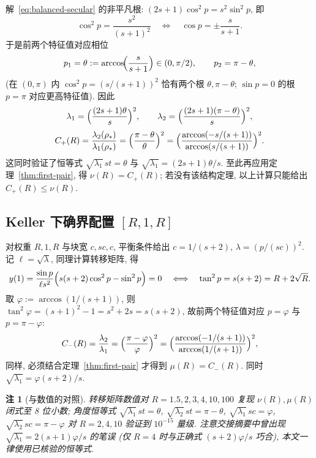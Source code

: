 \documentclass[UTF8]{ctexart}
\newtheorem{remark}[theorem]{注}
\begin{document}
解~\eqref{eq:balanced-secular} 的非平凡根: $(2s+1)\cos^2 p = s^2 \sin^2 p$, 即
\begin{equation}
	\cos^2 p = \frac{s^2}{(s+1)^2}
	\quad\Longleftrightarrow\quad
	\cos p = \pm \frac{s}{s+1} .
\end{equation}
于是前两个特征值对应相位
\begin{equation}
	p_1 = \theta := \arccos\!\Bigl( \frac{s}{s+1} \Bigr) \in (0, \pi/2),
	\qquad
	p_2 = \pi - \theta ,
\end{equation}
(在 $(0, \pi)$ 内 $\cos^2 p = (s/(s+1))^2$ 恰有两个根 $\theta, \pi-\theta$;
$\sin p = 0$ 的根 $p = \pi$ 对应更高特征值). 因此
\begin{equation}
	\lambda_1 = \Bigl( \frac{(2s+1)\theta}{s} \Bigr)^2,
	\qquad
	\lambda_2 = \Bigl( \frac{(2s+1)(\pi-\theta)}{s} \Bigr)^2,
\end{equation}
\begin{equation}
 C_+(R)=\frac{\lambda_2(\rho_*)}{\lambda_1(\rho_*)}
 =\Bigl(\frac{\pi-\theta}{\theta}\Bigr)^2
 =\Bigl(\frac{\arccos(-s/(s+1))}{\arccos(s/(s+1))}\Bigr)^2.
\end{equation}
这同时验证了恒等式 $\sqrt{\lambda_1}\,st = \theta$ 与 $\sqrt{\lambda_1} = (2s+1)\theta/s$.
至此再应用定理~\ref{thm:first-pair}, 得 $\nu(R)=C_+(R)$;
若没有该结构定理, 以上计算只能给出 $C_+(R)\leq\nu(R)$.

\subsection{Keller 下确界配置 \texorpdfstring{$[R,1,R]$}{[R,1,R]}}

对权重 $R, 1, R$ 与块宽 $c, sc, c$, 平衡条件给出 $c = 1/(s+2)$,
$\lambda = (p/(sc))^2$. 记 $\ell=\sqrt\lambda$, 同理计算转移矩阵, 得
\begin{equation}
	y(1) = \frac{\sin p}{\ell s^2}\Bigl( s(s+2)\cos^2 p - \sin^2 p \Bigr) = 0
	\quad\Longleftrightarrow\quad
	\tan^2 p = s(s+2) = R + 2\sqrt{R} .
\end{equation}
取 $\varphi := \arccos(1/(s+1))$, 则 $\tan^2\varphi = (s+1)^2 - 1 = s^2 + 2s = s(s+2)$,
故前两个特征值对应 $p = \varphi$ 与 $p = \pi - \varphi$:
\begin{equation}
 C_-(R)=\frac{\lambda_2}{\lambda_1}=\Bigl(\frac{\pi-\varphi}{\varphi}\Bigr)^2
 =\Bigl(\frac{\arccos(-1/(s+1))}{\arccos(1/(s+1))}\Bigr)^2,
\end{equation}
同样, 必须结合定理~\ref{thm:first-pair} 才得到 $\mu(R)=C_-(R)$.
同时 $\sqrt{\lambda_1}=\varphi(s+2)/s$.

\begin{remark}[与数值的对照]
转移矩阵数值对 $R = 1.5, 2, 3, 4, 10, 100$ 复现 $\nu(R), \mu(R)$ 闭式至 8 位小数;
角度恒等式 $\sqrt{\lambda_1}\,st = \theta$, $\sqrt{\lambda_2}\,st = \pi-\theta$,
$\sqrt{\lambda_1}\,sc = \varphi$, $\sqrt{\lambda_2}\,sc = \pi-\varphi$ 对 $R = 2, 4, 10$
验证到 $10^{-15}$ 量级. 注意交接摘要中曾出现 $\sqrt{\lambda_1} = 2(s+1)\varphi/s$ 的笔误
(仅 $R = 4$ 时与正确式 $(s+2)\varphi/s$ 巧合), 本文一律使用已核验的恒等式.
\end{remark}
\end{document}
